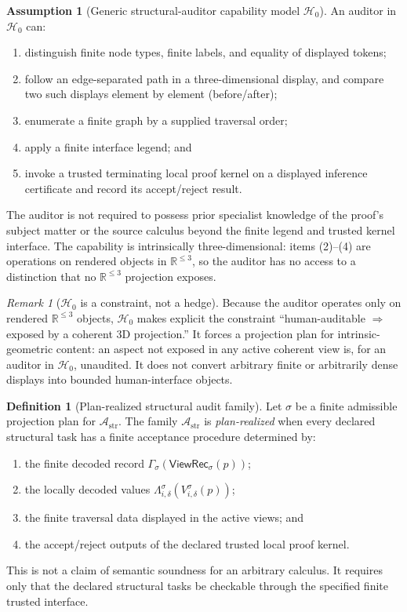 \documentclass[11pt]{article}
\newcommand{\R}{\mathbb R}
\newcommand{\mcA}{\mathcal A}
\newcommand{\mcH}{\mathcal H_0}
\newcommand{\ViewRec}{\ensuremath{\mathsf{ViewRec}}}
\theoremstyle{plain}
\theoremstyle{definition}
\newtheorem{definition}[theorem]{Definition}
\newtheorem{assumption}[theorem]{Assumption}
\theoremstyle{remark}
\newtheorem{remark}[theorem]{Remark}
\begin{document}
\begin{assumption}[Generic structural-auditor capability model $\mcH$]
\label{ass:h0}
An auditor in $\mcH$ can:
\begin{enumerate}
    \item distinguish finite node types, finite labels, and equality of displayed tokens;
    \item follow an edge-separated path in a three-dimensional display, and compare two such displays element by element (before/after);
    \item enumerate a finite graph by a supplied traversal order;
    \item apply a finite interface legend; and
    \item invoke a trusted terminating local proof kernel on a displayed inference certificate and record its accept/reject result.
\end{enumerate}
The auditor is not required to possess prior specialist knowledge of the proof's
subject matter or the source calculus beyond the finite legend and trusted
kernel interface.  The capability is intrinsically three-dimensional: items
(2)--(4) are operations on rendered objects in $\R^{\le 3}$, so the auditor has
no access to a distinction that no $\R^{\le 3}$ projection exposes.
\end{assumption}

\begin{remark}[$\mcH$ is a constraint, not a hedge]
\label{rem:h-constraint}
Because the auditor operates only on rendered $\R^{\le 3}$ objects, $\mcH$
makes explicit the constraint ``human-auditable $\Rightarrow$ exposed by a
coherent $3$D projection.''  It forces a projection plan for
intrinsic-geometric content: an aspect not exposed in any active coherent view
is, for an auditor in $\mcH$, unaudited.  It does not convert arbitrary finite
or arbitrarily dense displays into bounded human-interface objects.
\end{remark}

\begin{definition}[Plan-realized structural audit family]
\label{def:plan-realized}
Let $\sigma$ be a finite admissible projection plan for
$\mcA_{\mathrm{str}}$.  The family $\mcA_{\mathrm{str}}$ is
\emph{plan-realized} when every declared structural task has a finite acceptance
procedure determined by:
\begin{enumerate}[label=\textnormal{(\roman*)},leftmargin=2.6em]
\item the finite decoded record $\Gamma_\sigma(\ViewRec_\sigma(p))$;
\item the locally decoded values
$\Lambda^\sigma_{i,\delta}(V^\sigma_{i,\delta}(p))$;
\item the finite traversal data displayed in the active views; and
\item the accept/reject outputs of the declared trusted local proof kernel.
\end{enumerate}
This is not a claim of semantic soundness for an arbitrary calculus.  It
requires only that the declared structural tasks be checkable through the
specified finite trusted interface.
\end{definition}
\end{document}
